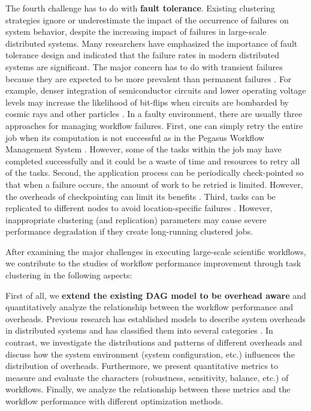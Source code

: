 The fourth challenge has to do with \textbf{fault tolerance}. Existing clustering strategies ignore or underestimate the impact of the occurrence of failures on system behavior, despite the increasing impact of failures in large-scale distributed systems. Many researchers \cite{Zhang2004, Tang1990, Schroeder2006, Sahoo2004} have emphasized the importance of fault tolerance design and indicated that the failure rates in modern distributed systems are significant. The major concern has to do with transient failures because they are expected to be more prevalent than permanent failures \cite{Zhang2004}. For example, denser integration of semiconductor circuits and lower operating voltage levels may increase the likelihood of bit-flips when circuits are bombarded by cosmic rays and other particles \cite{Zhang2004}. In a faulty environment, there are usually three approaches for managing workflow failures. First, one can simply retry the entire job when its computation is not successful as in the Pegasus Workflow Management System \cite{Deelman2004}. However, some of the tasks within the job may have completed successfully and it could be a waste of time and resources to retry all of the tasks. Second, the application process can be periodically check-pointed so that when a failure occurs, the amount of work to be retried is limited. However, the overheads of checkpointing can limit its benefits \cite{Zhang2004}. Third, tasks can be replicated to different nodes to avoid location-specific failures \cite{Zhang2009}. However, inappropriate clustering (and replication) parameters may cause severe performance degradation if they create long-running clustered jobs. 


After examining the major challenges in executing large-scale scientific workflows, we contribute to the studies of workflow performance improvement through task clustering in the following aspects:

First of all, we \textbf{extend the existing DAG model to be overhead aware} and quantitatively analyze the relationship between the workflow performance and overheads. Previous research has established models to describe system overheads in distributed systems and has classified them into several categories \cite{Prodan2007, Prodan2008}. In contrast, we investigate the distributions and patterns of different overheads and discuss how the system environment (system configuration, etc.) influences the distribution of overheads. Furthermore, we present quantitative metrics to measure and evaluate the characters (robustness, sensitivity, balance, etc.) of workflows. Finally, we analyze the relationship between these metrics and the workflow performance with different optimization methods. 

